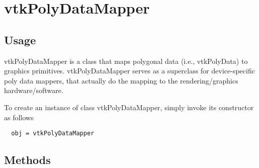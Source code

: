 \section{vtkPolyDataMapper}

\subsection{Usage}

 vtkPolyDataMapper is a class that maps polygonal data (i.e., vtkPolyData)
 to graphics primitives. vtkPolyDataMapper serves as a superclass for
 device-specific poly data mappers, that actually do the mapping to the
 rendering/graphics hardware/software.

To create an instance of class vtkPolyDataMapper, simply
invoke its constructor as follows
\begin{verbatim}
  obj = vtkPolyDataMapper
\end{verbatim}
\subsection{Methods}

